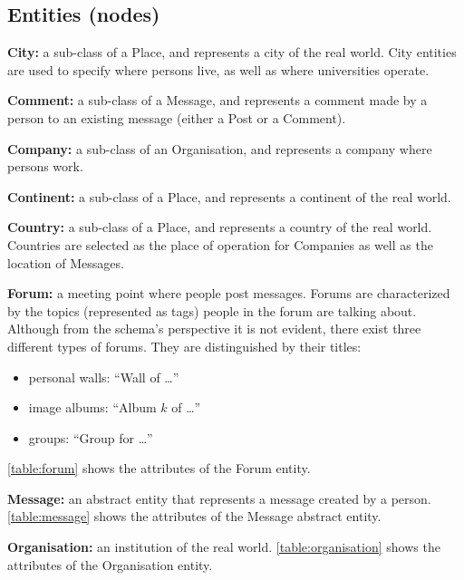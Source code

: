 \subsection{Entities (nodes)}

{\flushleft \textbf{City:}} a sub-class of a Place, and represents a
city of the real world. City entities are used to specify where persons live,
as well as where universities operate.

{\flushleft \textbf{Comment:}} a sub-class of a Message, and represents a
comment made by a person to an existing message (either a Post or a Comment).

{\flushleft \textbf{Company:}} a sub-class of an Organisation, and represents a company where persons work.

{\flushleft \textbf{Continent:}} a sub-class of a Place, and represents a continent of the real world.

{\flushleft \textbf{Country:}} a sub-class of a Place, and represents a country of the real world.
Countries are selected as the place of operation for Companies as well as the location of Messages.

{\flushleft \textbf{Forum:}} a meeting point where people
post messages. Forums are characterized by the topics (represented as tags)
people in the forum are talking about. Although from the schema's perspective
it is not evident, there exist three different types of
forums.  They are distinguished by their titles:

\begin{itemize}
    \item personal walls: ``Wall of \ldots''
    \item image albums: ``Album $k$ of \ldots''
    \item groups: ``Group for \ldots''
\end{itemize}

\autoref{table:forum} shows the attributes of the Forum entity.



{\flushleft \textbf{Message:}} an abstract entity that represents a message
created by a person. \autoref{table:message} shows the attributes of the Message
abstract entity.



{\flushleft \textbf{Organisation:}} an institution of the real
world. \autoref{table:organisation} shows the attributes of the Organisation
entity.



